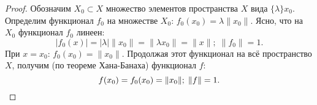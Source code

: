 \documentclass[12pt,a4paper,titlepage,oneside]{book}
\theoremstyle{definition}
\theoremstyle{plain}
\theoremstyle{break}
\theoremstyle{remark}
\theoremstyle{remark}
\theoremstyle{remark}
\theoremstyle{remark}
\theoremstyle{plain}
\theoremstyle{plain}
\begin{document}
\begin{proof}
Обозначим $X_0 \subset X$ множество элементов пространства $X$ вида $\{\lambda\}x_0$. Определим функционал $f_0$ на множестве $X_0$: $f_0(x_0)=\lambda\lVert x_0 \rVert$. Ясно, что на $X_0$ функционал $f_0$ линеен:
\begin{equation*}
| f_0(x)|=| \lambda | \lVert x_0 \rVert=\lVert \lambda x_0 \rVert=\lVert x\rVert; \; \lVert f_0\rVert=1.
\end{equation*}
При $x=x_0$:  $f_0(x_0)=\lVert x_0 \rVert$. Продолжая этот функционал на всё пространство $X$, получим (по теореме Хана-Банаха) функционал $f$:
\begin{equation*}
f(x_0)=f_0(x_0)=\lVert x_0 \rVert; \; \lVert f\rVert=1.
\qedhere
\end{equation*}
\end{proof}
\end{document}
